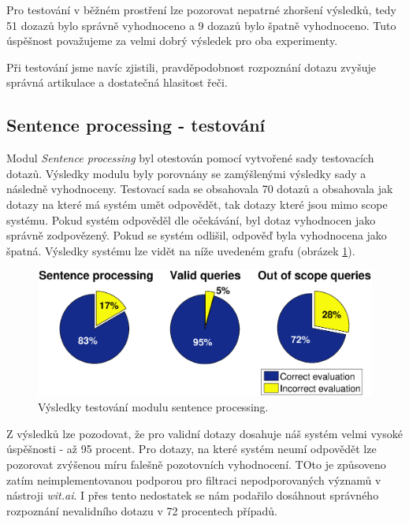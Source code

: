 \documentclass[12pt,a4paper]{article}
\begin{document}
Pro testování v běžném prostření lze pozorovat nepatrné zhoršení výsledků, tedy 51 dozazů bylo správně vyhodnoceno a 9 dozazů bylo špatně vyhodnoceno. 
Tuto úspěšnost považujeme za velmi dobrý výsledek pro oba experimenty.

Při testování jsme navíc zjistili, pravděpodobnost rozpoznání dotazu zvyšuje správná artikulace a dostatečná hlasitost řeči. 

\subsection{Sentence processing - testování}
Modul \textit{Sentence processing} byl otestován pomocí vytvořené sady testovacích dotazů. Výsledky modulu byly porovnány se zamýšlenými výsledky sady a následně vyhodnoceny.
Testovací sada se obsahovala 70 dotazů a obsahovala jak dotazy na které má systém umět odpovědět, tak dotazy které jsou mimo scope systému. Pokud systém odpověděl dle očekávání, byl dotaz vyhodnocen jako správně zodpovězený. Pokud se systém odlišil, odpověď byla vyhodnocena jako špatná. Výsledky systému lze vidět na níže uvedeném grafu (obrázek \ref{fig:sentence_processing}).

\begin{figure}[ht]
	\begin{center}
		\includegraphics[width = 1\textwidth ]{sentence.eps}
		\caption{Výsledky testování modulu sentence processing.}
		\label{fig:sentence_processing}
	\end{center}
\end{figure}

Z výsledků lze pozodovat, že pro validní dotazy dosahuje náš systém velmi vysoké úspěšnosti - až 95 procent. Pro dotazy, na které systém neumí odpovědět lze pozorovat zvýšenou míru falešně pozotovních vyhodnocení. TOto je způsoveno zatím neimplementovanou podporou pro filtraci nepodporovaných významů v nástroji \textit{wit.ai}. I přes tento nedostatek se nám podařilo dosáhnout správného rozpoznání nevalidního dotazu v 72 procentech případů.
\end{document}
